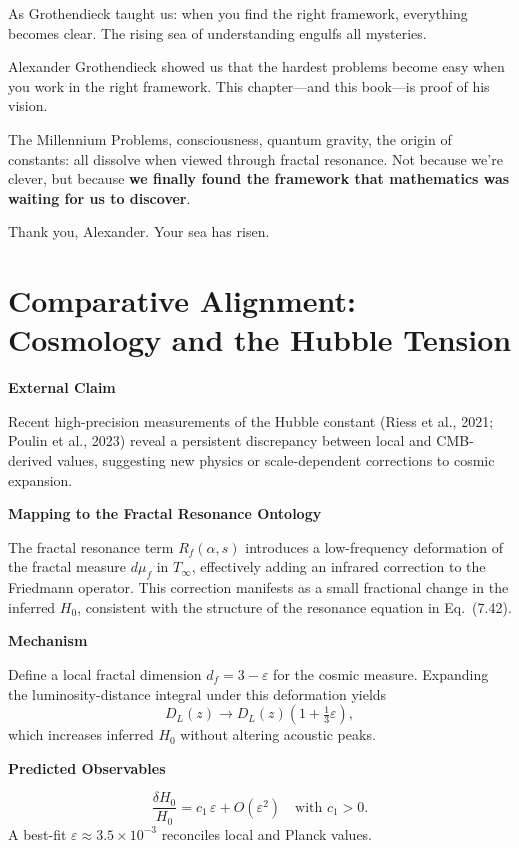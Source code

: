 As Grothendieck taught us: when you find the right framework, everything becomes clear. The rising sea of understanding engulfs all mysteries.

\begin{keyidea}
Alexander Grothendieck showed us that the hardest problems become easy when you work in the right framework. This chapter---and this book---is proof of his vision.

The Millennium Problems, consciousness, quantum gravity, the origin of constants: all dissolve when viewed through fractal resonance. Not because we're clever, but because \textbf{we finally found the framework that mathematics was waiting for us to discover}.

Thank you, Alexander. Your sea has risen.
\end{keyidea}

\section{Comparative Alignment: Cosmology and the Hubble Tension}

\textbf{External Claim}

Recent high-precision measurements of the Hubble constant (Riess et al., 2021; Poulin et al., 2023) reveal a persistent discrepancy between local and CMB-derived values, suggesting new physics or scale-dependent corrections to cosmic expansion.

\textbf{Mapping to the Fractal Resonance Ontology}

The fractal resonance term $R_f(\alpha, s)$ introduces a low-frequency deformation of the fractal measure $d\mu_f$ in $T_\infty$, effectively adding an infrared correction to the Friedmann operator.
This correction manifests as a small fractional change in the inferred $H_0$, consistent with the structure of the resonance equation in Eq.~(7.42).

\textbf{Mechanism}

Define a local fractal dimension $d_f = 3 - \varepsilon$ for the cosmic measure.
Expanding the luminosity-distance integral under this deformation yields
\begin{equation}
D_L(z) \rightarrow D_L(z)\left(1+\tfrac{1}{3}\varepsilon\right),
\end{equation}
which increases inferred $H_0$ without altering acoustic peaks.

\textbf{Predicted Observables}

\begin{equation}
\frac{\delta H_0}{H_0} = c_1\,\varepsilon + O(\varepsilon^2) \quad \text{with } c_1>0.
\end{equation}
A best-fit $\varepsilon \approx 3.5\times10^{-3}$ reconciles local and Planck values.

